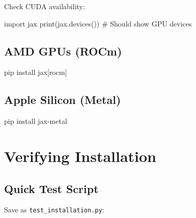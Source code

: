 \documentclass[
  11pt,
  letterpaper,
  oneside,
  openany]{book}
\newenvironment{Shaded}{\begin{snugshade}}{\end{snugshade}}
\newcommand{\BuiltInTok}[1]{\textcolor[rgb]{0.00,0.23,0.31}{#1}}
\newcommand{\CommentTok}[1]{\textcolor[rgb]{0.37,0.37,0.37}{#1}}
\newcommand{\ExtensionTok}[1]{\textcolor[rgb]{0.00,0.23,0.31}{#1}}
\newcommand{\ImportTok}[1]{\textcolor[rgb]{0.00,0.46,0.62}{#1}}
\newcommand{\NormalTok}[1]{\textcolor[rgb]{0.00,0.23,0.31}{#1}}
\newcommand{\PreprocessorTok}[1]{\textcolor[rgb]{0.68,0.00,0.00}{#1}}
\newcommand{\SpecialStringTok}[1]{\textcolor[rgb]{0.13,0.47,0.30}{#1}}
\begin{document}
Check CUDA availability:

\begin{Shaded}
\begin{Highlighting}[]
\ImportTok{import}\NormalTok{ jax}
\BuiltInTok{print}\NormalTok{(jax.devices())  }\CommentTok{\# Should show GPU devices}
\end{Highlighting}
\end{Shaded}

\subsection*{AMD GPUs (ROCm)}\label{amd-gpus-rocm}

\begin{Shaded}
\begin{Highlighting}[]
\ExtensionTok{pip}\NormalTok{ install jax}\PreprocessorTok{[}\SpecialStringTok{rocm}\PreprocessorTok{]}
\end{Highlighting}
\end{Shaded}

\subsection*{Apple Silicon (Metal)}\label{apple-silicon-metal}

\begin{Shaded}
\begin{Highlighting}[]
\ExtensionTok{pip}\NormalTok{ install jax{-}metal}
\end{Highlighting}
\end{Shaded}

\section*{Verifying Installation}\label{verifying-installation}


\subsection*{Quick Test Script}\label{quick-test-script}

Save as \texttt{test\_installation.py}:
\end{document}
